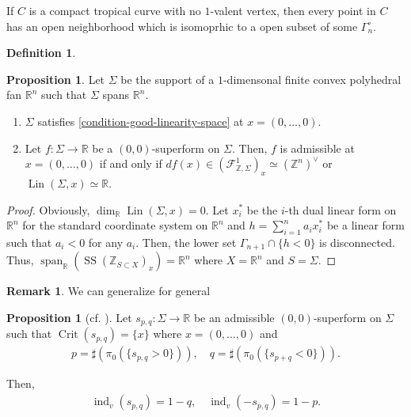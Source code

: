 \documentclass[a4paper,dvipdfmx,reqno,12pt]{amsart}
\theoremstyle{definition}
\newtheorem{definition}[theorem]{Definition}
\newtheorem{proposition}[theorem]{Proposition}
\newtheorem{remark}[theorem]{Remark}
\newcommand{\opn}[1]{\operatorname{#1}}
\numberwithin{equation}{section}
\begin{document}
If $C$ is a compact tropical curve with 
no $1$-valent vertex, then every point in $C$ has 
an open neighborhood which is isomoprhic to 
a open subset of some $\Gamma_{n}^{\circ}$.


\begin{definition}

\end{definition}

\begin{proposition}
\label{proposition-admissible-curve}
Let $\Sigma$ be the support of a $1$-dimensonal 
finite convex polyhedral fan $\mathbb{R}^{n}$ such that
$\Sigma$ spans $\mathbb{R}^{n}$.
\begin{enumerate}
\item $\Sigma$ satisfies
\cref{condition-good-linearity-space} at $x=(0,\ldots,0)$.
\item Let $f\colon \Sigma\to \mathbb{R}$ be a 
$(0,0)$-superform on $\Sigma$. Then, 
$f$ is admissible at $x=(0,\ldots,0)$ if and only if 
$df(x)\in (\mathcal{F}^{1}_{\mathbb{Z},\Sigma})_x\simeq (\mathbb{Z}^{n})^{\vee}$
or $\opn{Lin}(\Sigma,x)\simeq \mathbb{R}$.
\end{enumerate}
\end{proposition}

\begin{proof}
Obviously, $\opn{dim}_{\mathbb{R}}\opn{Lin}(\Sigma,x)=0$.
Let $x_i^{*}$ be the $i$-th dual linear form on 
$\mathbb{R}^{n}$ for the standard coordinate system on 
$\mathbb{R}^{n}$ and 
$h=\sum_{i=1}^{n} a_i x^{*}_i$ be a linear form
such that $a_i<0$ for any $a_i$.
Then, the lower set $\Gamma_{n+1}\cap \{h< 0\}$ is disconnected.
Thus, 
$\opn{span}_{\mathbb{R}}(\opn{SS}(\mathbb{Z}_{S\subset X})_x)
=\mathbb{R}^{n}$ where $X=\mathbb{R}^{n}$ and $S=\Sigma$.
\end{proof}

\begin{remark}
We can generalize for general
\end{remark}

\begin{proposition}[{cf. \cite{knill2012graph}}]
\label{proposition-n-valent}
Let $s_{p,q}\colon \Sigma\to \mathbb{R}$ be 
an admissible $(0,0)$-superform on $\Sigma$ 
such that $\opn{Crit}(s_{p,q})=\{x\}$ where
$x=(0,\ldots,0)$ and
\begin{align}
p=\sharp(\pi_0(\{s_{p,q}>0\})), \quad 
q=\sharp(\pi_0(\{s_{p+q}<0\})).
\end{align}

Then, 
\begin{align}
\opn{ind}_v(s_{p,q})=1-q ,\quad \opn{ind}_v(-s_{p,q})=1-p.
\end{align}

\end{proposition}
\end{document}
